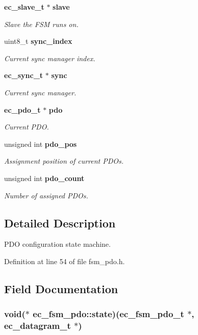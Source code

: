 \begin{DoxyCompactItemize}
{\bf ec\-\_\-slave\-\_\-t} $\ast$ {\bf slave}
\begin{DoxyCompactList}\small\item\em Slave the F\-S\-M runs on. \end{DoxyCompactList}\item 
uint8\-\_\-t {\bf sync\-\_\-index}
\begin{DoxyCompactList}\small\item\em Current sync manager index. \end{DoxyCompactList}\item 
{\bf ec\-\_\-sync\-\_\-t} $\ast$ {\bf sync}
\begin{DoxyCompactList}\small\item\em Current sync manager. \end{DoxyCompactList}\item 
{\bf ec\-\_\-pdo\-\_\-t} $\ast$ {\bf pdo}
\begin{DoxyCompactList}\small\item\em Current P\-D\-O. \end{DoxyCompactList}\item 
unsigned int {\bf pdo\-\_\-pos}
\begin{DoxyCompactList}\small\item\em Assignment position of current P\-D\-Os. \end{DoxyCompactList}\item 
unsigned int {\bf pdo\-\_\-count}
\begin{DoxyCompactList}\small\item\em Number of assigned P\-D\-Os. \end{DoxyCompactList}\end{DoxyCompactItemize}


\subsection{Detailed Description}
P\-D\-O configuration state machine. 

Definition at line 54 of file fsm\-\_\-pdo.\-h.



\subsection{Field Documentation}
\subsubsection[{state}]{\setlength{\rightskip}{0pt plus 5cm}void($\ast$ ec\-\_\-fsm\-\_\-pdo\-::state)({\bf ec\-\_\-fsm\-\_\-pdo\-\_\-t} $\ast$, {\bf ec\-\_\-datagram\-\_\-t} $\ast$)}\label{structec__fsm__pdo_a0395eeb4608437fc422ddb7df18ddf95}


